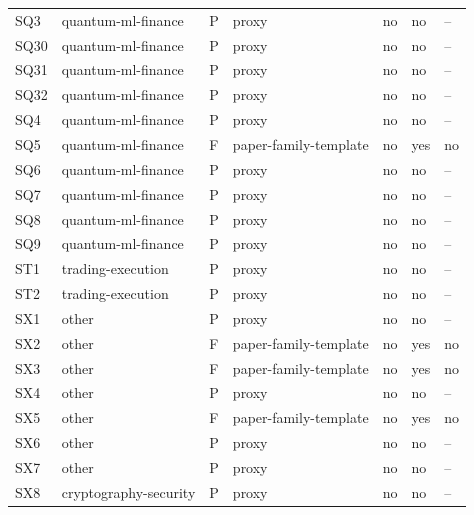 \begin{tabular}{lllllll}
SQ3 & quantum-ml-finance & P & proxy & no & no & -- \\
SQ30 & quantum-ml-finance & P & proxy & no & no & -- \\
SQ31 & quantum-ml-finance & P & proxy & no & no & -- \\
SQ32 & quantum-ml-finance & P & proxy & no & no & -- \\
SQ4 & quantum-ml-finance & P & proxy & no & no & -- \\
SQ5 & quantum-ml-finance & F & paper-family-template & no & yes & no \\
SQ6 & quantum-ml-finance & P & proxy & no & no & -- \\
SQ7 & quantum-ml-finance & P & proxy & no & no & -- \\
SQ8 & quantum-ml-finance & P & proxy & no & no & -- \\
SQ9 & quantum-ml-finance & P & proxy & no & no & -- \\
ST1 & trading-execution & P & proxy & no & no & -- \\
ST2 & trading-execution & P & proxy & no & no & -- \\
SX1 & other & P & proxy & no & no & -- \\
SX2 & other & F & paper-family-template & no & yes & no \\
SX3 & other & F & paper-family-template & no & yes & no \\
SX4 & other & P & proxy & no & no & -- \\
SX5 & other & F & paper-family-template & no & yes & no \\
SX6 & other & P & proxy & no & no & -- \\
SX7 & other & P & proxy & no & no & -- \\
SX8 & cryptography-security & P & proxy & no & no & -- \\
\bottomrule
\end{tabular}
